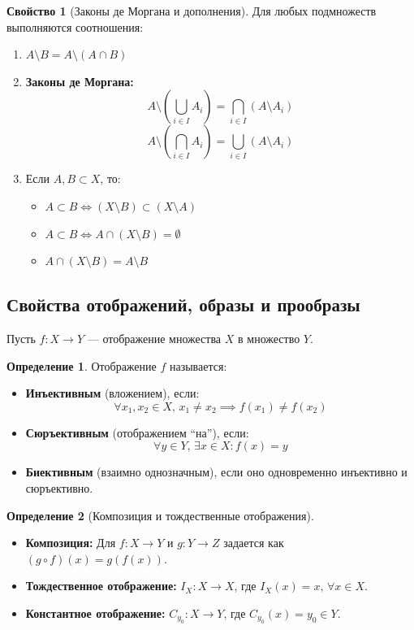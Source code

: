 \documentclass[12pt,a4paper]{article}
\theoremstyle{definition}
\newtheorem{definition}{Определение}[section]
\newtheorem{property}{Свойство}[section]
\begin{document}
\begin{property}[Законы де Моргана и дополнения]
Для любых подмножеств выполняются соотношения:
\begin{enumerate}
    \item $A \setminus B = A \setminus (A \cap B)$
    \item \textbf{Законы де Моргана:}
    $$A \setminus \left(\bigcup_{i \in I} A_i\right) = \bigcap_{i \in I} (A \setminus A_i)$$
    $$A \setminus \left(\bigcap_{i \in I} A_i\right) = \bigcup_{i \in I} (A \setminus A_i)$$
    \item Если $A, B \subset X$, то:
    \begin{itemize}
        \item $A \subset B \iff (X \setminus B) \subset (X \setminus A)$
        \item $A \subset B \iff A \cap (X \setminus B) = \emptyset$
        \item $A \cap (X \setminus B) = A \setminus B$
    \end{itemize}
\end{enumerate}
\end{property}\subsection{Свойства отображений, образы и прообразы}

Пусть $f: X \to Y$ --- отображение множества $X$ в множество $Y$.

\begin{definition}
Отображение $f$ называется:
\begin{itemize}
    \item \textbf{Инъективным} (вложением), если:
    $$\forall x_1, x_2 \in X, \, x_1 \neq x_2 \implies f(x_1) \neq f(x_2)$$
    \item \textbf{Сюръективным} (отображением ``на''), если:
    $$\forall y \in Y, \, \exists x \in X : f(x) = y$$
    \item \textbf{Биективным} (взаимно однозначным), если оно одновременно инъективно и сюръективно.
\end{itemize}
\end{definition}

\begin{definition}[Композиция и тождественные отображения]
\begin{itemize}
    \item \textbf{Композиция:} Для $f: X \to Y$ и $g: Y \to Z$ задается как $(g \circ f)(x) = g(f(x))$.
    \item \textbf{Тождественное отображение:} $I_X: X \to X$, где $I_X(x) = x, \, \forall x \in X$.
    \item \textbf{Константное отображение:} $C_{y_0}: X \to Y$, где $C_{y_0}(x) = y_0 \in Y$.
\end{itemize}
\end{definition}
\end{document}
